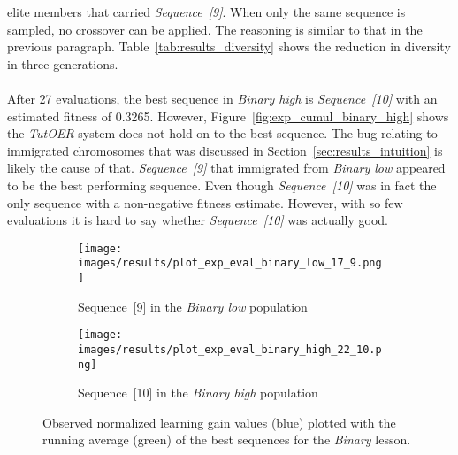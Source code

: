 elite members that carried \emph{Sequence~[9]}. When only the same sequence is
sampled, no crossover can be applied. The reasoning is similar to that in the
previous paragraph. Table~\ref{tab:results_diversity} shows the reduction in
diversity in three generations.\\\\
\noindent
After 27 evaluations, the best sequence in \emph{Binary high} is
\emph{Sequence~[10]} with an estimated fitness of 0.3265. However,
Figure~\ref{fig:exp_cumul_binary_high} shows the \emph{TutOER} system does
not hold on to the best sequence. The bug relating to immigrated chromosomes
that was discussed in Section~\ref{sec:results_intuition} is likely the cause
of that. \emph{Sequence~[9]} that immigrated from \emph{Binary low} appeared to
be the best performing sequence. Even though \emph{Sequence~[10]} was in fact
the only sequence with a non-negative fitness estimate. However, with so few
evaluations it is hard to say whether \emph{Sequence~[10]} was actually good.

\begin{figure}[ht]
	\begin{subfigure}{0.9\linewidth}
	\centering
	\texttt{[image: images/results/plot\_exp\_eval\_binary\_low\_17\_9.png]}
	\caption{Sequence~[9] in the \emph{Binary low} population}
	\label{fig:exp_eval_binary_low_17}
	\end{subfigure}
	\hfill
	\begin{subfigure}{0.9\linewidth}
	\centering
	\texttt{[image: images/results/plot\_exp\_eval\_binary\_high\_22\_10.png]}
	\caption{Sequence~[10] in the \emph{Binary high} population}
	\label{fig:exp_eval_binary_high_10}
	\end{subfigure}
	\caption{Observed normalized learning gain values (blue) plotted with the
		running average (green) of the best sequences for the \emph{Binary}
	lesson.}
	\label{fig:exp_eval_binary}
\end{figure}


